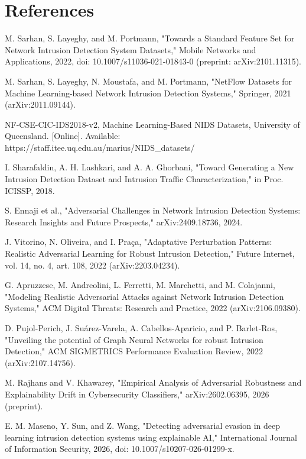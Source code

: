 \documentclass[12pt,a4paper]{report}
\begin{document}
\chapter*{References}
\begin{enumerate}[label={[\arabic*]}]
\item M. Sarhan, S. Layeghy, and M. Portmann, "Towards a Standard Feature Set for Network Intrusion Detection System Datasets," Mobile Networks and Applications, 2022, doi: 10.1007/s11036-021-01843-0 (preprint: arXiv:2101.11315).
\item M. Sarhan, S. Layeghy, N. Moustafa, and M. Portmann, "NetFlow Datasets for Machine Learning-based Network Intrusion Detection Systems," Springer, 2021 (arXiv:2011.09144).
\item NF-CSE-CIC-IDS2018-v2, Machine Learning-Based NIDS Datasets, University of Queensland. [Online]. Available: https://staff.itee.uq.edu.au/marius/NIDS\_datasets/
\item I. Sharafaldin, A. H. Lashkari, and A. A. Ghorbani, "Toward Generating a New Intrusion Detection Dataset and Intrusion Traffic Characterization," in Proc. ICISSP, 2018.
\item S. Ennaji et al., "Adversarial Challenges in Network Intrusion Detection Systems: Research Insights and Future Prospects," arXiv:2409.18736, 2024.
\item J. Vitorino, N. Oliveira, and I. Pra\c{c}a, "Adaptative Perturbation Patterns: Realistic Adversarial Learning for Robust Intrusion Detection," Future Internet, vol. 14, no. 4, art. 108, 2022 (arXiv:2203.04234).
\item G. Apruzzese, M. Andreolini, L. Ferretti, M. Marchetti, and M. Colajanni, "Modeling Realistic Adversarial Attacks against Network Intrusion Detection Systems," ACM Digital Threats: Research and Practice, 2022 (arXiv:2106.09380).
\item D. Pujol-Perich, J. Su\'arez-Varela, A. Cabellos-Aparicio, and P. Barlet-Ros, "Unveiling the potential of Graph Neural Networks for robust Intrusion Detection," ACM SIGMETRICS Performance Evaluation Review, 2022 (arXiv:2107.14756).
\item M. Rajhans and V. Khawarey, "Empirical Analysis of Adversarial Robustness and Explainability Drift in Cybersecurity Classifiers," arXiv:2602.06395, 2026 (preprint).
\item E. M. Maseno, Y. Sun, and Z. Wang, "Detecting adversarial evasion in deep learning intrusion detection systems using explainable AI," International Journal of Information Security, 2026, doi: 10.1007/s10207-026-01299-x.

\end{enumerate}
\end{document}
